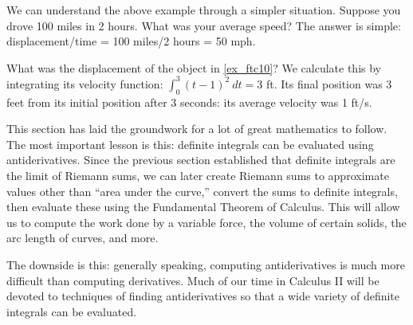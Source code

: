 We can understand the above example through a simpler situation. Suppose you drove 100 miles in 2 hours. What was your average speed? The answer is simple: displacement/time = 100 miles/2 hours = 50 mph.

What was the displacement of the object in \autoref{ex_ftc10}? We calculate this by integrating its velocity function: $\int_0^3 (t-1)^2\ dt = 3$ ft. Its final position was 3 feet from its initial position after 3 seconds: its average velocity was 1 ft/s.\bigskip

This section has laid the groundwork for a lot of great mathematics to follow. The most important lesson is this: definite integrals can be evaluated using antiderivatives. Since the previous section established that definite integrals are the limit of Riemann sums, we can later create Riemann sums to approximate values other than ``area under the curve,'' convert the sums to definite integrals, then evaluate these using the Fundamental Theorem of Calculus. This will allow us to compute the work done by a variable force, the volume of certain solids, the arc length of curves, and more.

The downside is this: generally speaking, computing antiderivatives is much more difficult than computing derivatives. Much of our time in Calculus II will be devoted to techniques of finding antiderivatives so that a wide variety of definite integrals can be evaluated.

